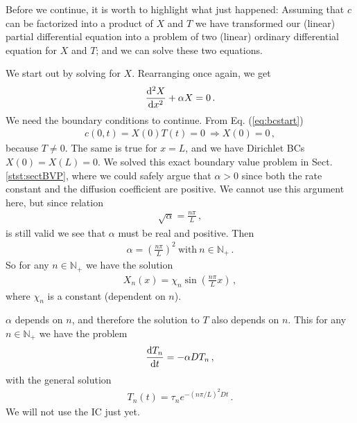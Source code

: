 Before we continue, it is worth to highlight what just happened: Assuming that $c$ can be factorized into 
a product of $X$ and $T$ we have transformed our (linear) 
partial differential equation into a problem of two (linear) ordinary differential 
equation for $X$ and $T$; and we can solve these two equations. 

We start out by solving for $X$. Rearranging once again, we get
\begin{eqnarray}
	\frac{\mathrm{d}^2 X}{\mathrm{d} x^2} + \alpha X = 0 \, .
\end{eqnarray}
We need the boundary conditions to continue. From Eq. (\ref{eq:bcstart}) 
\begin{eqnarray}
	c(0, t) = X(0)T(t) = 0 \ \Rightarrow X(0) = 0\, ,
\end{eqnarray}
because $T \neq 0$.  The same is true for $x=L$, and we have Dirichlet BCs $X(0)=X(L)=0$. 
We solved this exact boundary value problem in Sect. \ref{stst:sectBVP}, where
we could safely argue that $\alpha > 0$ since both the rate constant and the
diffusion coefficient are positive. We cannot use this argument here, but since 
relation 
\begin{eqnarray}
	\sqrt{\alpha} = \frac{n\pi}{L} \, , 
\end{eqnarray}
is still valid we see that $\alpha$ must be real and positive. Then
\begin{eqnarray}
	\alpha = \left( \frac{n \pi}{L} \right)^2 \ \text{with} \ n \in \mathbb{N}_+ \, . 
\end{eqnarray}
So for any $n \in \mathbb{N}_+$ we have the solution
\begin{eqnarray}
	X_n(x) = \chi_n \sin\left(\frac{n\pi}{L} x\right) \, ,
\end{eqnarray}
where $\chi_n$ is a constant (dependent on $n$).

$\alpha$ depends on $n$, and therefore the solution to $T$ also depends on
$n$. This for any $n \in \mathbb{N}_+$ we have the problem
\begin{eqnarray}
	\frac{\mathrm{d} T_n}{\mathrm{d} t} = -\alpha D T_n \, ,
\end{eqnarray}
with the general solution
\begin{eqnarray}
	T_n(t) = \tau_n e^{-(n\pi/L)^2Dt} \, .
\end{eqnarray}
We will not use the IC just yet. 

